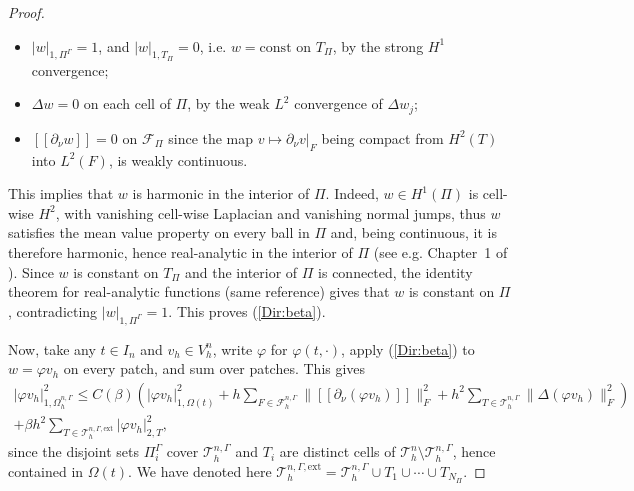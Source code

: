 \documentclass[11pt,a4paper]{article}
\theoremstyle{plain}
\theoremstyle{definition}
\theoremstyle{remark}
\numberwithin{equation}{section}
\begin{document}
\begin{proof}
\begin{itemize}
	\item $|w|_{1,\Pi^{\Gamma}}=1$, and $|w|_{1,T_{\Pi}}=0$, i.e. $w=\textrm{const}$ on $T_{\Pi}$, by the strong $H^1$ convergence;
	\item $\Delta w=0$ on each cell of $\Pi$, by the weak $L^2$ convergence	of $\Delta w_j$;
	\item $[\![\partial_\nu w]\!]=0$ on $\mathcal{F}_{\Pi}$ since the map	$v\mapsto\partial_\nu v|_F$ being compact from $H^2(T)$ into $L^2(F)$, is weakly continuous.
\end{itemize}
This implies that $w$ is harmonic in the interior of $\Pi$. Indeed, $w\in H^1(\Pi)$ is cell-wise $H^2$, with vanishing cell-wise Laplacian and vanishing normal jumps, thus $w$ satisfies the mean value property on every ball in $\Pi$ and, being continuous, it is therefore harmonic, hence real-analytic in the interior of $\Pi$ (see e.g. Chapter~1 of \cite{Axler2001}). Since 
$w$ is constant on $T_{\Pi}$ and the interior of $\Pi$ is connected, the identity theorem for real-analytic functions (same reference) gives that $w$ is constant on $\Pi$,  contradicting
$|w|_{1,\Pi^\Gamma}=1$. This proves (\ref{Dir:beta}).

Now, take any $t\in I_n$ and $v_h\in V_h^n$, write
$\varphi$ for $\varphi(t,\cdot)$, apply (\ref{Dir:beta}) to $w=\varphi v_h$ on every patch, and sum over patches. This gives
\begin{multline}\label{Dir:sum}
|\varphi v_h|_{1,\Omega_h^{n,\Gamma}}^2 \leqslant C(\beta)\left(
|\varphi v_h|_{1,\Omega(t)}^2
+ h\sum_{F\in\mathcal{F}_h^{n,\Gamma}}
\big\| [\![ \partial_\nu (\varphi v_h) ]\!]\big\|_{F}^2
+ h^2\sum_{T\in\mathcal{T}_h^{n,\Gamma}}\|\Delta (\varphi v_h)\|_{F}^2 \right)\\
+ \beta h^2 \sum_{T\in\mathcal{T}_h^{n,\Gamma,\textrm{ext}}} |\varphi v_h|_{2,T}^2 ,
\end{multline}
since the disjoint sets $\Pi_i^\Gamma$ cover $\mathcal{T}_h^{n,\Gamma}$ and $T_i$ are distinct cells of
$\mathcal{T}_h^n\setminus\mathcal{T}_h^{n,\Gamma}$, hence contained in $\Omega(t)$. We have denoted here $\mathcal{T}_h^{n,\Gamma,\textrm{ext}}=\mathcal{T}_h^{n,\Gamma} \cup T_1 \cup \cdots \cup T_{N_\Pi}$.


\end{proof}
\end{document}
